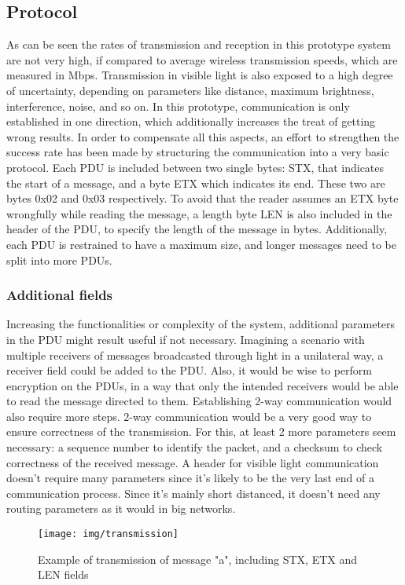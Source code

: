 \subsection{Protocol}
As can be seen the rates of transmission and reception in this prototype system are not very high, if compared to average wireless transmission speeds, which are measured in Mbps.
Transmission in visible light is also exposed to a high degree of uncertainty, depending on parameters like distance, maximum brightness, interference, noise, and so on.
In this prototype, communication is only established in one direction, which additionally increases the treat of getting wrong results.
In order to compensate all this aspects, an effort to strengthen the success rate has been made by structuring the communication into a very basic protocol.
Each PDU is included between two single bytes: STX, that indicates the start of a message, and a byte ETX which indicates its end. These two are bytes 0x02 and 0x03 respectively. To avoid that the reader assumes an ETX byte wrongfully while reading the message, a length byte LEN is also included in the header of the PDU, to specify the length of the message in bytes.
Additionally, each PDU is restrained to have a maximum size, and longer messages need to be split into more PDUs.

\subsubsection{Additional fields}
Increasing the functionalities or complexity of the system, additional parameters in the PDU might result useful if not necessary. 
Imagining a scenario with multiple receivers of messages broadcasted through light in a unilateral way, a receiver field could be added to the PDU. Also, it would be wise to perform encryption on the PDUs, in a way that only the intended receivers would be able to read the message directed to them.
Establishing 2-way communication would also require more steps. 2-way communication would be a very good way to ensure correctness of the transmission. For this, at least 2 more parameters seem necessary: a sequence number to identify the packet, and a checksum to check correctness of the received message.
A header for visible light communication doesn't require many parameters since it's likely to be the very last end of a communication process. Since it's mainly short distanced, it doesn't need any routing parameters as it would in big networks. 

\begin{figure}
\centering
\texttt{[image: img/transmission]}
\label{fig:txpeak}
\caption{Example of transmission of message "a", including STX, ETX and LEN fields}
\end{figure}



